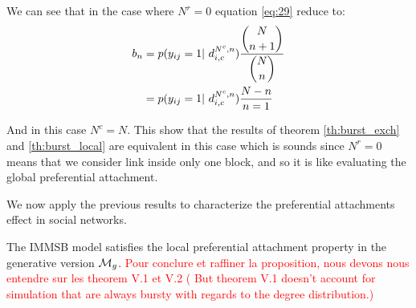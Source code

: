 We can see that in the case where $N^r=0$ equation \eqref{eq:29} reduce to:
\begin{align*}
b_n &= p(y_{ij}=1 | d_{i,c}^{N^c,n}) \frac{\dbinom{N}{n+1}}{ \dbinom{N}{n} } \\
 &=  p(y_{ij}=1 | d_{i,c}^{N^c,n}) \frac{N-n}{n=1}
\end{align*}

And in this case $N^c=N$. This show that the results of theorem \ref{th:burst_exch} and \ref{th:burst_local} are equivalent in this case which is sounds since $N^r=0$ means that we consider link inside only one block, and so it is like evaluating the global preferential attachment.

We now apply the previous results to characterize the preferential attachments effect in social networks.


\begin{proposition}
    The IMMSB model satisfies the local preferential attachment property in the generative version $\mathcal{M}_g$. \textcolor{red}{Pour conclure et raffiner la proposition, nous devons nous entendre sur les theorem V.1 et V.2 ( But theorem V.1 doesn't account for simulation that are always bursty with regards to the degree distribution.)}
\end{proposition}

